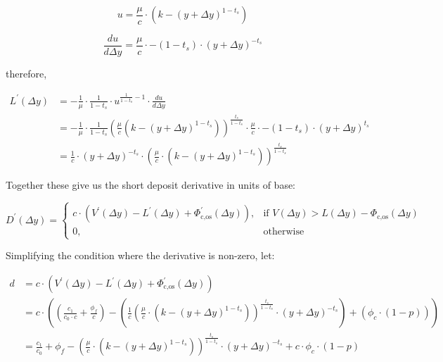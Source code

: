 \begin{equation}
u = \frac{\mu}{c} \cdot \left( k - (y + \Delta y)^{1-t_s} \right)
\end{equation}

\begin{equation}
\frac{du}{d \Delta y} = \frac{\mu}{c} \cdot -(1 - t_s) \cdot (y + \Delta y)^{-t_s}
\end{equation}

therefore,

\begin{equation}\label{eq-short-principal-derivative}
\begin{aligned}
L^{\prime}(\Delta y) &= - \frac{1}{\mu} \cdot \frac{1}{1-t_s} \cdot u^{\frac{1}{1-t_s} - 1} \cdot \frac{du}{d \Delta y} \\
&= - \frac{1}{\mu} \cdot \frac{1}{1-t_s} \left( \frac{\mu}{c} \left( k - (y + \Delta y)^{1 - t_s} \right) \right)^{\frac{t_s}{1-t_s}}
\cdot \frac{\mu}{c} \cdot -(1 - t_s) \cdot (y + \Delta y)^{t_s} \\
&= \frac{1}{c} \cdot (y + \Delta y)^{-t_s} \cdot \left( \frac{\mu}{c} \cdot \left( k - (y + \Delta y)^{1 - t_s} \right) \right)^{\frac{t_s}{1 - t_s}}
\end{aligned}
\end{equation}

Together these give us the short deposit derivative in units of base:

\begin{equation}
D^{\prime}(\Delta y) =
\begin{cases}
    c \cdot \left( V^{\prime}(\Delta y) - L^{\prime}(\Delta y) + \Phi^{\prime}_{\text{c,os}}(\Delta y) \right),
    & \text{if } V(\Delta y) > L(\Delta y) - \Phi_{\text{c,os}}(\Delta y) \\
    0,              & \text{otherwise}
\end{cases}
\end{equation}

Simplifying the condition where the derivative is non-zero, let:

\begin{displaymath}
\begin{aligned}
d &= c \cdot \left( V^{\prime}(\Delta y) - L^{\prime}(\Delta y) + \Phi^{\prime}_{\text{c,os}}(\Delta y) \right) \\
&= c \cdot \left( 
\left( \tfrac{c_{1}}{c_{0} \cdot c} + \tfrac{\phi_{f}}{c} \right)
- \left( \frac{1}{c} \left( \frac{\mu}{c} \cdot \left( k - (y + \Delta y)^{1 - t_s} \right) \right)^{\frac{t_s}{1 - t_s}} \cdot (y + \Delta y)^{-t_s} \right)
+ \left( \phi_{c} \cdot (1 - p) \right) \right) \\
&= 
\tfrac{c_{1}}{c_{0}} + \phi_{f}
- \left( \frac{\mu}{c} \cdot \left( k - (y + \Delta y)^{1 - t_s} \right) \right)^{\frac{t_s}{1 - t_s}} \cdot (y + \Delta y)^{-t_s}
+ c \cdot \phi_{c} \cdot (1 - p) \\
\end{aligned}
\end{displaymath}


